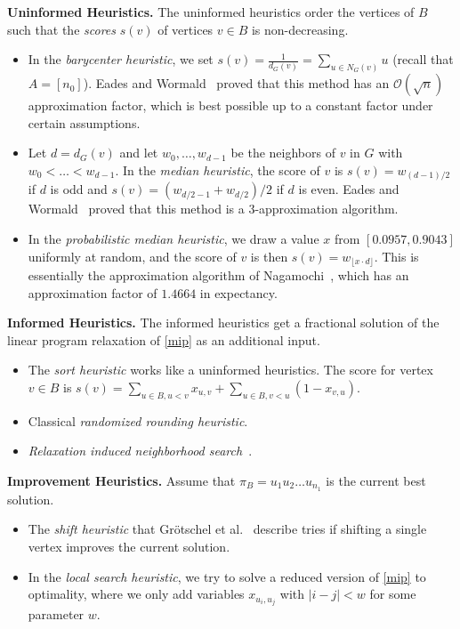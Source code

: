 \documentclass[a4paper,UKenglish,cleveref, autoref, thm-restate]{lipics-v2021}
\begin{document}
\medskip
\noindent
\textbf{Uninformed Heuristics.}
The uninformed heuristics order the vertices of $B$ such that the \emph{scores} $s(v)$ of vertices $v \in B$ is non-decreasing.
\begin{itemize}
\item In the \emph{barycenter heuristic}, we set $s(v) = \frac{1}{d_G(v)} = \sum_{u \in N_G(v)} u$ (recall that $A = [n_0]$). Eades and Wormald~\cite{eades1994edge} proved that this method has an $\mathcal{O}(\sqrt{n})$ approximation factor, which is best possible up to a constant factor under certain assumptions.
\item Let $d = d_G(v)$ and let $w_0, \dots, w_{d-1}$ be the neighbors of $v$ in $G$ with $w_0 < \dots < w_{d-1}$.
In the \emph{median heuristic}, the score of $v$ is $s(v) = w_{(d-1)/2}$ if $d$ is odd and $s(v) = (w_{d/2 - 1} + w_{d/2})/2$ if $d$ is even.
Eades and Wormald~\cite{eades1994edge} proved that this method is a 3-approximation algorithm.
\item In the \emph{probabilistic median heuristic}, we draw a value $x$ from $[0.0957, 0.9043]$ uniformly at random, and the score of $v$ is then $s(v) = w_{\lfloor x \cdot d \rfloor}$.
This is essentially the approximation algorithm of Nagamochi~\cite{nagamochi2005improved}, which has an approximation factor of $1.4664$ in expectancy.
\end{itemize}

\noindent
\textbf{Informed Heuristics.}
The informed heuristics get a fractional solution of the linear program relaxation of \eqref{mip} as an additional input.
\begin{itemize}
\item The \emph{sort heuristic} works like a uninformed heuristics.
The score for vertex $v \in B$ is $s(v) = \sum_{u \in B, u < v} x_{u,v} + \sum_{u \in B, v < u} (1 - x_{v, u})$.
\item Classical \emph{randomized rounding heuristic}.
\item \emph{Relaxation induced neighborhood search}~\cite{danna2005exploring}.
\end{itemize}

\noindent
\textbf{Improvement Heuristics.}
Assume that $\pi_B = u_1u_2 \dots u_{n_1}$ is the current best solution.
\begin{itemize}
\item The \emph{shift heuristic} that Grötschel et al.~\cite{grotschel1984cutting} describe tries if shifting a single vertex improves the current solution.
\item In the \emph{local search heuristic}, we try to solve a reduced version of \eqref{mip} to optimality, where we only add variables $x_{u_i, u_j}$ with $|i-j| < w$ for some parameter $w$.
\end{itemize}
\end{document}
